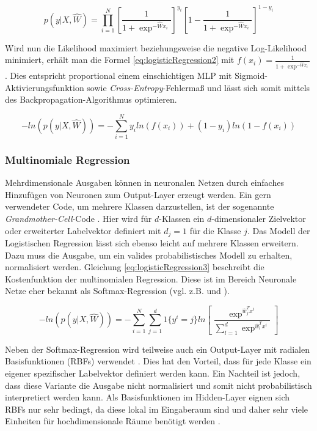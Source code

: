 \begin{equation} 
\label{eq:logisticRegression}
p(y|X,\hat{W}) = \prod_{i=1}^N [\frac{1}{1 + \exp^{-\hat{W}x_i}} ]^{y_i}  [1 - \frac{1}{1 + \exp^{-\hat{W}x_i}} ]^{1-y_i}
\end{equation}

Wird nun die Likelihood maximiert beziehungsweise die negative Log-\-Likeli\-hood minimiert, erhält man die Formel \ref{eq:logisticRegression2} mit $f(x_i) = \frac{1}{1 + \exp^{-\hat{W}x_i}} $. Dies entspricht proportional einem einschichtigen MLP mit Sigmoid-Akti\-vierungs\-funktion sowie \textit{Cross-Entropy}-Fehlermaß und lässt sich somit mittels des Back\-propa\-gation-Algorithmus optimieren. 

\begin{equation} 
\label{eq:logisticRegression2}
- ln(p(y|X,\hat{W})) = - \sum_{i=1}^N  y_i ln(f(x_i)) + (1-y_i) ln(1 - f(x_i))
\end{equation}


\subsubsection{Multinomiale Regression}
Mehrdimensionale Ausgaben können in neuronalen Netzen durch einfaches Hinzufügen von Neuronen zum Output-Layer erzeugt werden. 
Ein gern verwendeter Code, um mehrere Klassen darzustellen, ist der sogenannte \textit{Grand\-mother-Cell}-Code \cite[vgl.][]{LeCun1998}. Hier wird für $d$-Klassen ein $d$-dimensionaler Zielvektor oder erweiterter Labelvektor definiert mit $d_j = 1$ für die Klasse $j$.
Das Modell der Logistischen Regression lässt sich ebenso leicht auf mehrere Klassen erweitern. Dazu muss die Ausgabe, um ein valides probabilistisches Modell zu erhalten, normalisiert werden. Gleichung \ref{eq:logisticRegression3} beschreibt die Kostenfunktion der multinomialen Regression. Diese ist im Bereich Neuronale Netze eher bekannt als Softmax-Regression (vgl. z.B. \cite{Krizhevsky2012} und \cite{Bengio2015}).

\begin{equation} 
\label{eq:logisticRegression3}
- ln(p(y|X,\hat{W})) = - \sum_{i=1}^N  \sum_{j=1}^d 1\{y^i = j \} ln[\frac{\exp^{\hat{w}_j^Tx^i}}{\sum_{l=1}^d\exp^{\hat{w}_l^Tx^i}} ]
\end{equation}


Neben der Softmax-Regression wird teilweise auch ein Output-Layer mit radialen Basisfunktionen (RBFs) verwendet \cite[vgl.][]{LeCun1998}. Dies hat den Vorteil, dass für jede Klasse ein eigener spezifischer Labelvektor definiert werden kann. Ein Nachteil ist jedoch, dass diese Variante die Ausgabe nicht normalisiert und somit nicht probabilistisch interpretiert werden kann. 
Als Basisfunktionen im Hidden-Layer eignen sich RBFs nur sehr bedingt, da diese lokal im Eingaberaum sind und daher sehr viele Einheiten für hochdimensionale Räume benötigt werden \cite[vgl.][]{LeCun1998b}.

